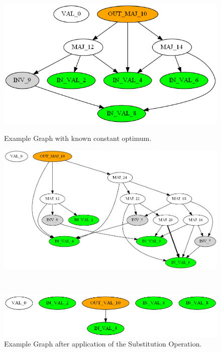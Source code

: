 \documentclass[
	accentcolor=1c,%
	type=intern,
	marginpar=false,
	ruledheaders=section,
	class=report,
	BCOR=5mm,
      parskip=half-,
	fontsize=10pt
	]{tudapub}
\begin{document}
			\begin{figure}[!ht]
				\begin{minipage}{\textwidth}
					\centering
					\begin{minipage}{.45\textwidth}
						\includegraphics[width=\textwidth]{images/eval_0.png}
						\caption{Example Graph with known constant optimum.}
						\label{fig_0}
					\end{minipage} \quad
					\begin{minipage}{.45\textwidth}
						\includegraphics[width=\textwidth]{images/eval_1.png}			\caption{Example Graph after application of the Substitution Operation.}
						\label{fig_1}
					\end{minipage}\\
					\begin{minipage}{.45\textwidth}
						\includegraphics[width=\textwidth]{images/eval_2.png}

\end{minipage}
\end{minipage}
\end{figure}
\end{document}
